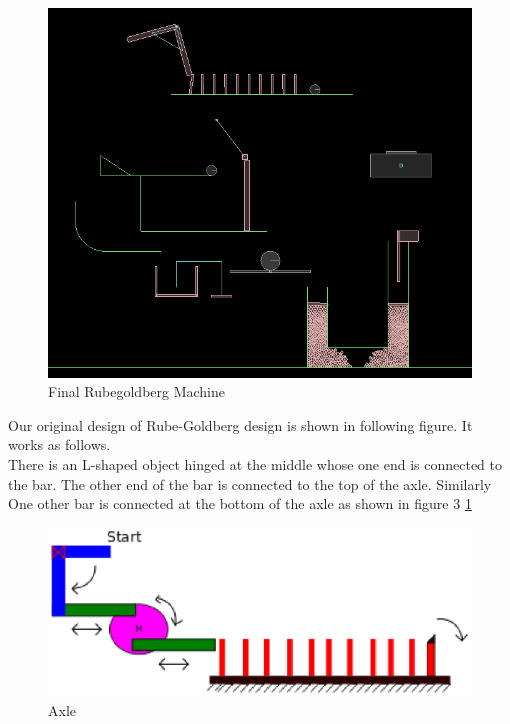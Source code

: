 \documentclass[a4paper,11pt]{article}
\begin{document}
{\newpage
\begin{figure}[h]
    \centering
    \includegraphics[scale=0.6]{images/final_rg}
    \caption{Final Rubegoldberg Machine}
\end{figure}
\newpage

\indent Our original design of Rube-Goldberg design is shown in following figure. It works as follows. \\
\indent There is an L-shaped object hinged at the middle whose one end is connected to the bar. The other end of the bar is connected to the top of the axle. Similarly One other bar is connected at the bottom of the axle as shown in figure 3 \ref{fig:trigger}\\

\begin{figure}[h]
    \centering
    \label{fig:trigger}
    \includegraphics[scale=0.6]{images/trigger}
    \caption{Axle}
\end{figure}

}
\end{document}
